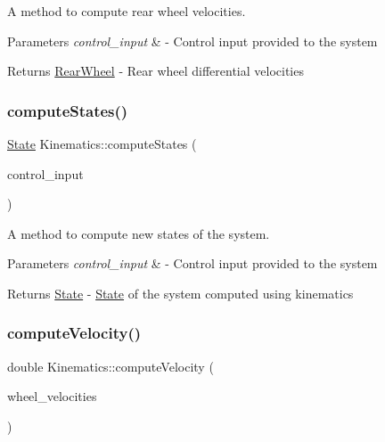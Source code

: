 A method to compute rear wheel velocities. 


\begin{DoxyParams}{Parameters}
{\em control\+\_\+input} & -\/ Control input provided to the system \\
\hline
\end{DoxyParams}
\begin{DoxyReturn}{Returns}
\hyperlink{structRearWheel}{Rear\+Wheel} -\/ Rear wheel differential velocities 
\end{DoxyReturn}
\mbox{\label{classKinematics_adb73a0d2efe57b3be58daee9bfb989e3}} 
\subsubsection{\texorpdfstring{compute\+States()}{computeStates()}}
{\footnotesize\ttfamily \hyperlink{structState}{State} Kinematics\+::compute\+States (\begin{DoxyParamCaption}\item[{ackermann\+\_\+msgs\+::\+Ackermann\+Drive\+Stamped}]{control\+\_\+input }\end{DoxyParamCaption})}



A method to compute new states of the system. 


\begin{DoxyParams}{Parameters}
{\em control\+\_\+input} & -\/ Control input provided to the system \\
\hline
\end{DoxyParams}
\begin{DoxyReturn}{Returns}
\hyperlink{structState}{State} -\/ \hyperlink{structState}{State} of the system computed using kinematics 
\end{DoxyReturn}
\mbox{\label{classKinematics_a7159c40fdd982621f5def3e8aeb5687d}} 
\subsubsection{\texorpdfstring{compute\+Velocity()}{computeVelocity()}}
{\footnotesize\ttfamily double Kinematics\+::compute\+Velocity (\begin{DoxyParamCaption}\item[{const std\+::vector$<$ double $>$ \&}]{wheel\+\_\+velocities }\end{DoxyParamCaption})}



